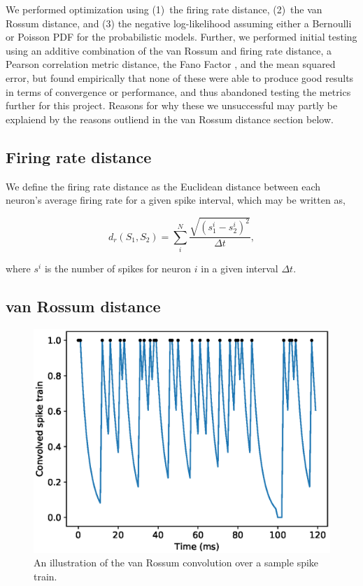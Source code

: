 \documentclass[mphil,deptreport,ianc]{infthesis} %
\begin{document}
We performed optimization using (1)~the firing rate distance, (2)~the van Rossum distance, and (3) the negative log-likelihood assuming either a Bernoulli or Poisson PDF for the probabilistic models.
Further, we performed initial testing using an additive combination of the van Rossum and firing rate distance, a Pearson correlation metric distance, the Fano Factor \cite{Tchumatchenko2011, Kreuz2013a}, and the mean squared error, but found empirically that none of these were able to produce good results in terms of convergence or performance, and thus abandoned testing the metrics further for this project.
Reasons for why these we unsuccessful may partly be explaiend by the reasons outliend in the van Rossum distance section below.

\subsection{Firing rate distance}

We define the firing rate distance as the Euclidean distance between each neuron's average firing rate for a given spike interval, which may be written as,

\begin{equation}
    d_r(S_1, S_2) = \sum_i^N{\frac{\sqrt{(s_1^i - s_2^i)^2}}{\Delta t}},
\end{equation}

where $s^i$ is the number of spikes for neuron $i$ in a given interval $\Delta t$.

\subsection{van Rossum distance}

\begin{figure}
    \centering
    \vskip -0.1in
    \includegraphics[width=0.8\columnwidth]{figures/samples/neur_vr_conv_sample.eps}
    \vskip -0.1in
    \caption{An illustration of the van Rossum convolution over a sample spike train.}
    \label{fig:vrd_conv_sample}
    \vskip -0.2in
\end{figure}
\end{document}

